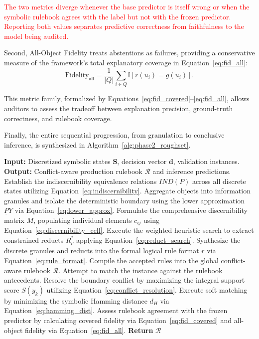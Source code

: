 \documentclass[make,article,submit,pdftex,moreauthors]{Definitions/mdpi}
\newcommand{\Rule}{\mathcal{R}}
\newcommand{\Rone}[1]{\textcolor{red}{#1}}
\begin{document}
\Rone{The two metrics diverge whenever the base predictor is itself wrong or when the symbolic rulebook agrees with the label but not with the frozen predictor. Reporting both values separates predictive correctness from faithfulness to the model being audited.}

Second, All-Object Fidelity treats abstentions as failures, providing a conservative measure of the framework's total explanatory coverage in Equation~\eqref{eq:fid_all}:
\begin{equation}
 \label{eq:fid_all}
 \mathrm{Fidelity}_{\mathrm{all}} = \frac{1}{|Q|}\sum_{i \in Q}\mathbb{I}[r(u_i) = g(u_i)].
\end{equation}

This metric family, formalized by Equations~\eqref{eq:fid_covered}--\eqref{eq:fid_all}, allows auditors to assess the tradeoff between explanation precision, ground-truth correctness, and rulebook coverage.

Finally, the entire sequential progression, from granulation to conclusive inference, is synthesized in Algorithm~\ref{alg:phase2_roughset}.

\begin{algorithm}[!ht]
\caption{Rough-Set Granulation, Reduct Solver, and Inference (Phases 2.3--2.5)}
\label{alg:phase2_roughset}
\begin{algorithmic}[1]
\State \textbf{Input:} Discretized symbolic states $\mathbf{S}$, decision vector $\mathbf{d}$, validation instances.
\State \textbf{Output:} Conflict-aware production rulebook $\Rule$ and inference predictions.
\State Establish the indiscernibility equivalence relations $IND(P)$ across all discrete states utilizing Equation~\eqref{eq:indiscernibility}.
\State Aggregate objects into information granules and isolate the deterministic boundary using the lower approximation $\underline{P}Y$ via Equation~\eqref{eq:lower_approx}.
\State Formulate the comprehensive discernibility matrix $M$, populating individual elements $c_{ij}$ using Equation~\eqref{eq:discernibility_cell}.
\State Execute the weighted heuristic search to extract constrained reducts $R_{\rho}^{\ast}$ applying Equation~\eqref{eq:reduct_search}.
\State Synthesize the discrete granules and reducts into the formal logical rule format $r$ via Equation~\eqref{eq:rule_format}.
\State Compile the accepted rules into the global conflict-aware rulebook $\Rule$.
    \State Attempt to match the instance against the rulebook antecedents.
        \State Resolve the boundary conflict by maximizing the integral support score $S(y_k)$ utilizing Equation~\eqref{eq:conflict_resolution}.
        \State Execute soft matching by minimizing the symbolic Hamming distance $d_H$ via Equation~\eqref{eq:hamming_dist}.
    \EndIf
\EndFor
\State Assess rulebook agreement with the frozen predictor by calculating covered fidelity via Equation~\eqref{eq:fid_covered} and all-object fidelity via Equation~\eqref{eq:fid_all}.
\State \textbf{Return} $\Rule$
\end{algorithmic}
\end{algorithm}
\end{document}
